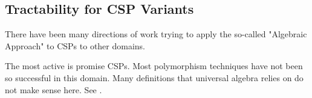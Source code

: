 









\subsection{Tractability for CSP Variants}\label{sec:beyond csps}

There have been many directions of work trying to apply the so-called "Algebraic Approach" to CSPs to other domains.

The most active is promise CSPs. Most polymorphism techniques have not been so successful in this domain. Many definitions that universal algebra relies on do not make sense here. See \citep{krokhin2022invitation}.

